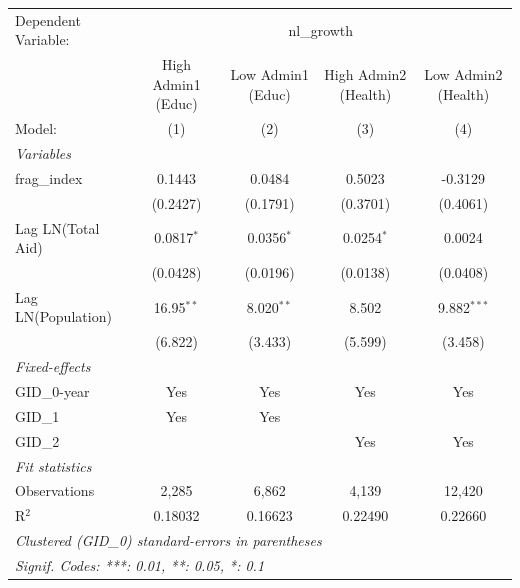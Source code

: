 \begingroup
\centering
\begin{tabular}{lcccc}
   \tabularnewline \midrule \midrule
   Dependent Variable: & \multicolumn{4}{c}{nl\_growth}\\
                      & High Admin1 (Educ) & Low Admin1 (Educ) & High Admin2 (Health) & Low Admin2 (Health) \\   
   Model:             & (1)                & (2)               & (3)                  & (4)\\  
   \midrule
   \emph{Variables}\\
   frag\_index        & 0.1443             & 0.0484            & 0.5023               & -0.3129\\   
                      & (0.2427)           & (0.1791)          & (0.3701)             & (0.4061)\\   
   Lag LN(Total Aid)  & 0.0817$^{*}$       & 0.0356$^{*}$      & 0.0254$^{*}$         & 0.0024\\   
                      & (0.0428)           & (0.0196)          & (0.0138)             & (0.0408)\\   
   Lag LN(Population) & 16.95$^{**}$       & 8.020$^{**}$      & 8.502                & 9.882$^{***}$\\   
                      & (6.822)            & (3.433)           & (5.599)              & (3.458)\\   
   \midrule
   \emph{Fixed-effects}\\
   GID\_0-year        & Yes                & Yes               & Yes                  & Yes\\  
   GID\_1             & Yes                & Yes               &                      & \\  
   GID\_2             &                    &                   & Yes                  & Yes\\  
   \midrule
   \emph{Fit statistics}\\
   Observations       & 2,285              & 6,862             & 4,139                & 12,420\\  
   R$^2$              & 0.18032            & 0.16623           & 0.22490              & 0.22660\\  
   \midrule \midrule
   \multicolumn{5}{l}{\emph{Clustered (GID\_0) standard-errors in parentheses}}\\
   \multicolumn{5}{l}{\emph{Signif. Codes: ***: 0.01, **: 0.05, *: 0.1}}\\
\end{tabular}
\par\endgroup


